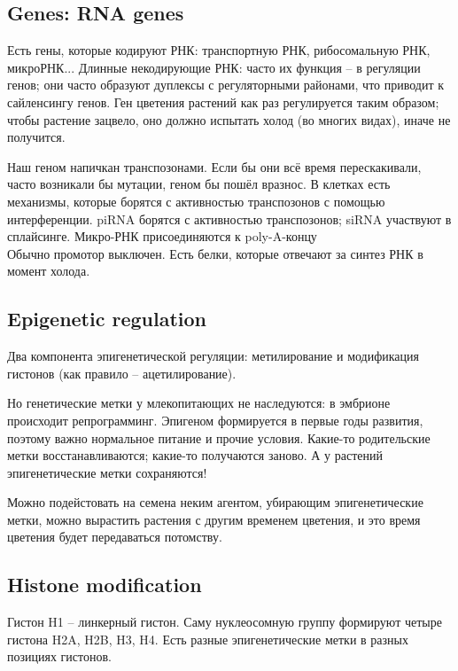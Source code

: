 \documentclass[main.tex]{subfiles}
\begin{document}
\subsection{Genes: RNA genes}

Есть гены, которые кодируют РНК: транспортную РНК, рибосомальную РНК, микроРНК...
Длинные некодирующие РНК: часто их функция -- в регуляции генов; они часто образуют дуплексы с регуляторными районами, что приводит к сайленсингу генов.
Ген цветения растений как раз регулируется таким образом; чтобы растение зацвело, оно должно испытать холод (во многих видах), иначе не получится.

Наш геном напичкан транспозонами.
Если бы они всё время перескакивали, часто возникали бы мутации, геном бы пошёл вразнос.
В клетках есть механизмы, которые борятся с активностью транспозонов с помощью интерференции.
piRNA борятся с активностью транспозонов; siRNA участвуют в сплайсинге.
Микро-РНК присоединяются к poly-A-концу %
\\

Обычно промотор выключен.
Есть белки, которые отвечают за синтез РНК в момент холода.

\subsection{Epigenetic regulation}

Два компонента эпигенетической регуляции: метилирование и модификация гистонов (как правило -- ацетилирование).

Но генетические метки у млекопитающих не наследуются: в эмбрионе происходит репрограмминг.
Эпигеном формируется в первые годы развития, поэтому важно нормальное питание и прочие условия.
Какие-то родительские метки восстанавливаются; какие-то получаются заново.
А у растений эпигенетические метки сохраняются!

Можно подейстовать на семена неким агентом, убирающим эпигенетические метки, можно вырастить растения с другим временем цветения, и это время цветения будет передаваться потомству.

\subsection{Histone modification}

Гистон H1 -- линкерный гистон.
Саму нуклеосомную группу формируют четыре гистона  H2A, H2B, H3, H4.
Есть разные эпигенетические метки в разных позициях гистонов.
\end{document}

